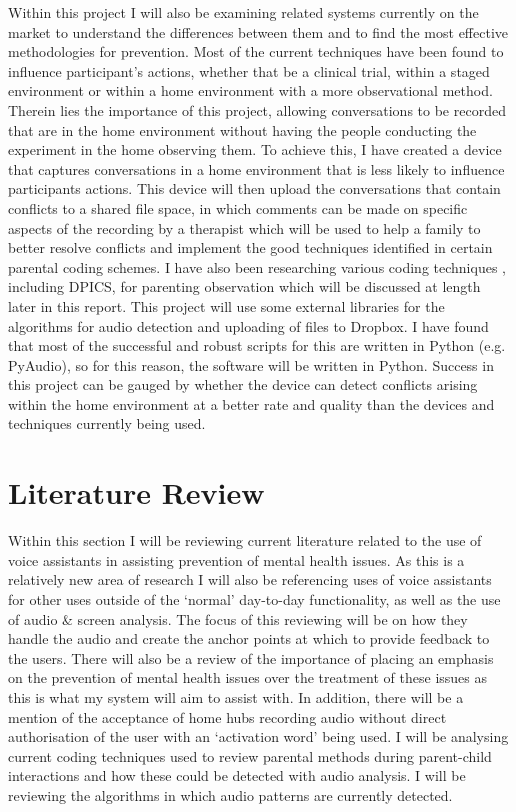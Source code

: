 \documentclass[a4paper,11pt]{report}
\begin{document}
Within this project I will also be examining related systems currently on the market to understand the differences between them and to find the most effective methodologies for prevention. Most of the current techniques have been found to influence participant’s actions, whether that be a clinical trial, within a staged environment or within a home environment with a more observational method. Therein lies the importance of this project, allowing conversations to be recorded that are in the home environment without having the people conducting the experiment in the home observing them. To achieve this, I have created a device that captures conversations in a home environment that is less likely to influence participants actions. This device will then upload the conversations that contain conflicts to a shared file space, in which comments can be made on specific aspects of the recording by a therapist which will be used to help a family to better resolve conflicts and implement the good techniques identified in certain parental coding schemes. I have also been researching various coding techniques , including DPICS, for parenting observation which will be discussed at length later in this report. This project will use some external libraries for the algorithms for audio detection and uploading of files to Dropbox. I have found that most of the successful and robust scripts for this are written in Python (e.g. PyAudio), so for this reason, the software will be written in Python. Success in this project can be gauged by whether the device can detect conflicts arising within the home environment at a better rate and quality than the devices and techniques currently being used.\\


\chapter{Literature Review}
Within this section I will be reviewing current literature related to the use of voice assistants in assisting prevention of mental health issues. As this is a relatively new area of research I will also be referencing uses of voice assistants for other uses outside of the ‘normal’ day-to-day functionality, as well as the use of audio \& screen analysis. The focus of this reviewing will be on how they handle the audio and create the anchor points at which to provide feedback to the users. There will also be a review of the importance of placing an emphasis on the prevention of mental health issues over the treatment of these issues as this is what my system will aim to assist with. In addition, there will be a mention of the acceptance of home hubs recording audio without direct authorisation of the user with an ‘activation word’ being used. I will be analysing current coding techniques used to review parental methods during parent-child interactions and how these could be detected with audio analysis. I will be reviewing the algorithms in which audio patterns are currently detected. 
\end{document}
